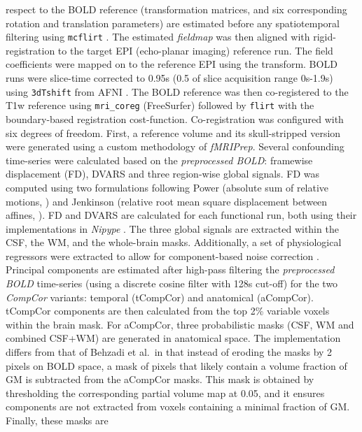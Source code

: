 \documentclass[
]{article}
\begin{document}
\begin{description}
respect to the BOLD reference (transformation matrices, and six
corresponding rotation and translation parameters) are estimated before
any spatiotemporal filtering using \texttt{mcflirt} \citep[FSL
6.0.5.1:57b01774,][]{mcflirt}. The estimated \emph{fieldmap} was then
aligned with rigid-registration to the target EPI (echo-planar imaging)
reference run. The field coefficients were mapped on to the reference
EPI using the transform. BOLD runs were slice-time corrected to 0.95s
(0.5 of slice acquisition range 0s-1.9s) using \texttt{3dTshift} from
AFNI \citep[RRID:SCR\_005927]{afni}. The BOLD reference was then
co-registered to the T1w reference using \texttt{mri\_coreg}
(FreeSurfer) followed by \texttt{flirt} \citep[FSL
6.0.5.1:57b01774,][]{flirt} with the boundary-based registration
\citep{bbr} cost-function. Co-registration was configured with six
degrees of freedom. First, a reference volume and its skull-stripped
version were generated using a custom methodology of \emph{fMRIPrep}.
Several confounding time-series were calculated based on the
\emph{preprocessed BOLD}: framewise displacement (FD), DVARS and three
region-wise global signals. FD was computed using two formulations
following Power (absolute sum of relative motions,
\citet{power_fd_dvars}) and Jenkinson (relative root mean square
displacement between affines, \citet{mcflirt}). FD and DVARS are
calculated for each functional run, both using their implementations in
\emph{Nipype} \citep[following the definitions by][]{power_fd_dvars}.
The three global signals are extracted within the CSF, the WM, and the
whole-brain masks. Additionally, a set of physiological regressors were
extracted to allow for component-based noise correction
\citep[\emph{CompCor},][]{compcor}. Principal components are estimated
after high-pass filtering the \emph{preprocessed BOLD} time-series
(using a discrete cosine filter with 128s cut-off) for the two
\emph{CompCor} variants: temporal (tCompCor) and anatomical (aCompCor).
tCompCor components are then calculated from the top 2\% variable voxels
within the brain mask. For aCompCor, three probabilistic masks (CSF, WM
and combined CSF+WM) are generated in anatomical space. The
implementation differs from that of Behzadi et al.~in that instead of
eroding the masks by 2 pixels on BOLD space, a mask of pixels that
likely contain a volume fraction of GM is subtracted from the aCompCor
masks. This mask is obtained by thresholding the corresponding partial
volume map at 0.05, and it ensures components are not extracted from
voxels containing a minimal fraction of GM. Finally, these masks are

\end{description}
\end{document}
